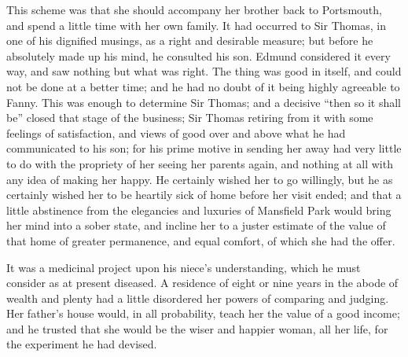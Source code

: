\documentclass{article}
\begin{document}
This scheme was that she should accompany her brother
back to Portsmouth, and spend a little time with her
own family.  It had occurred to Sir Thomas, in one of his
dignified musings, as a right and desirable measure;
but before he absolutely made up his mind, he consulted
his son.  Edmund considered it every way, and saw nothing
but what was right.  The thing was good in itself,
and could not be done at a better time; and he had no doubt
of it being highly agreeable to Fanny.  This was enough
to determine Sir Thomas; and a decisive ``then so it shall be''
closed that stage of the business; Sir Thomas retiring
from it with some feelings of satisfaction, and views
of good over and above what he had communicated to his son;
for his prime motive in sending her away had very little
to do with the propriety of her seeing her parents again,
and nothing at all with any idea of making her happy.
He certainly wished her to go willingly, but he as certainly
wished her to be heartily sick of home before her visit ended;
and that a little abstinence from the elegancies and luxuries
of Mansfield Park would bring her mind into a sober state,
and incline her to a juster estimate of the value
of that home of greater permanence, and equal comfort,
of which she had the offer.

It was a medicinal project upon his niece's understanding,
which he must consider as at present diseased.
A residence of eight or nine years in the abode of wealth
and plenty had a little disordered her powers of comparing
and judging.  Her father's house would, in all probability,
teach her the value of a good income; and he trusted that
she would be the wiser and happier woman, all her life,
for the experiment he had devised.
\end{document}
